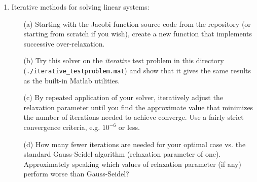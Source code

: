 \documentclass{article}
\begin{document}
\begin{enumerate}
  
  \item Iterative methods for solving linear systems:  
  \begin{itemize}
    \item[(a)] Starting with the Jacobi function source code from the repository (or starting from scratch if you wish), create a new function that implements successive over-relaxation.  
    \item[(b)] Try this solver on the \emph{iterative} test problem in this directory (\texttt{./iterative\_testproblem.mat}) and show that it gives the same results as the built-in Matlab utilities. 
    \item[(c)] By repeated application of your solver, iteratively adjust the relaxation parameter until you find the approximate value that minimizes the number of iterations needed to achieve converge.  Use a fairly strict convergence criteria, e.g. $10^{-6}$ or less.  
    \item[(d)]  How many fewer iterations are needed for your optimal case vs. the standard Gauss-Seidel algorithm (relaxation parameter of one).  Approximately speaking which values of relaxation parameter (if any) perform worse than Gauss-Seidel?  
  \end{itemize}  
\end{enumerate}
\end{document}
